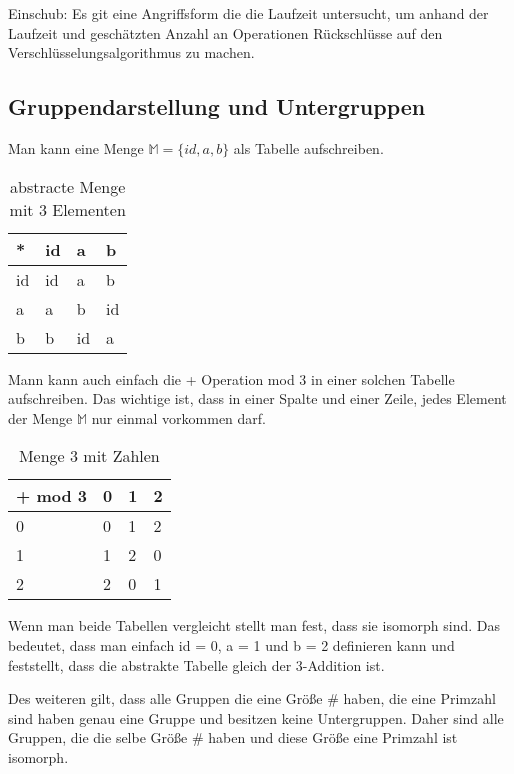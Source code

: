 Einschub: Es git eine Angriffsform die die Laufzeit untersucht, um anhand der Laufzeit und geschätzten Anzahl an Operationen Rückschlüsse auf den Verschlüsselungsalgorithmus zu machen.

\subsection{Gruppendarstellung und Untergruppen}
\label{sec:GruppenUtergruppen}

Man kann eine Menge $\mathbb{M} = \{ id, a, b\}$ als Tabelle aufschreiben.

\begin{table}[H]
\centering
\begin{tabular}{|l|l|l|l|}
\hline
*  & id & a  & b  \\ \hline
id & id & a  & b  \\ \hline
a  & a  & b  & id \\ \hline
b  & b  & id & a  \\ \hline
\end{tabular}
\caption{abstracte Menge mit 3 Elementen}
\label{Menge 3-Abstract}
\end{table}

Mann kann auch einfach die + Operation mod 3 in einer solchen Tabelle aufschreiben. Das wichtige ist, dass in einer Spalte und einer Zeile, jedes Element der Menge $\mathbb{M}$ nur einmal vorkommen darf.

\begin{table}[H]
\centering
\begin{tabular}{|l|l|l|l|}
\hline
+ mod 3 & 0 & 1 & 2 \\ \hline
0       & 0 & 1 & 2 \\ \hline
1       & 1 & 2 & 0 \\ \hline
2       & 2 & 0 & 1 \\ \hline
\end{tabular}
\caption{Menge 3 mit Zahlen}
\label{Menge 3-Addition}
\end{table}

Wenn man beide Tabellen vergleicht stellt man fest, dass sie isomorph sind. Das bedeutet, dass man einfach id = 0, a = 1 und b = 2 definieren kann und feststellt, dass die abstrakte Tabelle gleich der 3-Addition ist.

Des weiteren gilt, dass alle Gruppen die eine Größe $\#$ haben, die eine Primzahl sind haben genau eine Gruppe und besitzen keine Untergruppen. Daher sind alle Gruppen, die die selbe Größe $\#$ haben und diese Größe eine Primzahl ist isomorph.

